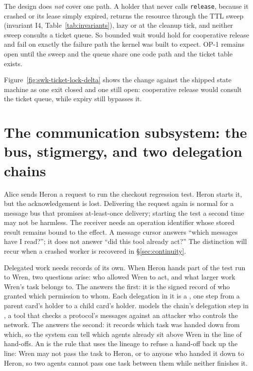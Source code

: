 \documentclass[11pt,a4paper]{article}
\theoremstyle{definition}
\theoremstyle{remark}
\begin{document}
The design does \emph{not} cover one path. A holder that never calls
\texttt{release}, because it crashed or its lease simply expired, returns the
resource through the TTL sweep (invariant I4, Table~\ref{tab:invariants}), lazy or
at the cleanup tick, and neither sweep consults a ticket queue.
So bounded wait would hold for cooperative release and fail on exactly the
failure path the kernel was built to expect. OP-1 remains open until the sweep
and the queue share one code path and the ticket table exists.



Figure~\ref{fig:swk-ticket-lock-delta} shows the change against the shipped
state machine as one exit closed and one still open: cooperative release would consult the ticket queue, while
expiry still bypasses it.

\pdexercisepointer{\ref{ex:swk-release-idempotent}}{\ref{ex:swk-op1-ticket}}{\pageref{ex:swk-release-idempotent}}

\section{The communication subsystem: the bus, stigmergy, and two delegation chains}
\label{sec:comm}

Alice sends Heron a request to run the checkout regression test. Heron starts
it, but the acknowledgement is lost. Delivering the request again is normal for
a message bus that promises at-least-once delivery; starting the test a second
time may not be harmless.
The receiver needs an operation identifier whose stored result remains bound
to the effect. A message cursor answers ``which messages have I read?''; it
does not answer ``did this tool already act?'' The distinction will recur
when a crashed worker is recovered in \S\ref{sec:continuity}.

Delegated work needs records of its own. When Heron hands part of the test
run to Wren, two questions arise: who allowed Wren to act, and what larger work
Wren's task belongs to. The  answers the first: it
is the signed record of who granted which permission to whom. Each delegation
in it is a , one step from a parent card's holder to a child
card's holder.  models the chain's
delegation step in , a tool that checks a protocol's messages against an
attacker who controls the network. The
 answers the second: it records which task was
handed down from which, so the system can tell which agents already sit above
Wren in the line of hand-offs. An  is the rule that uses
the lineage to refuse a hand-off back up the line: Wren may not pass the task
to Heron, or to anyone who handed it down to Heron, so two agents cannot pass
one task between them while neither finishes it.
\end{document}
